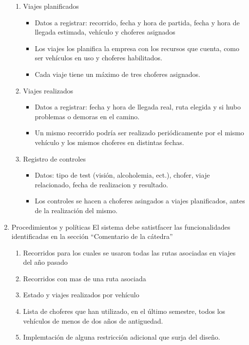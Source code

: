 \begin{enumerate}
  \begin{enumerate}[label=\Roman{*}]
  \item Viajes planificados
    \begin{itemize}
      \item Datos a registrar: recorrido, fecha y hora de partida, fecha y hora de llegada estimada, veh\'iculo y choferes asignados
      \item Los viajes los planifica la empresa con los recursos que cuenta, como ser veh\'iculos en uso y choferes habilitados. 
      \item Cada viaje tiene un m\'aximo de tres choferes asignados.
    \end{itemize}  
  \item Viajes realizados
    \begin{itemize}
      \item Datos a registrar: fecha y hora de llegada real, ruta elegida y si hubo problemas o demoras en el camino.
      \item Un mismo recorrido podría ser realizado periódicamente por el mismo vehículo y los mismos choferes en distintas fechas.
    \end{itemize}  
  \item Registro de controles
    \begin{itemize}
      \item Datos: tipo de test (visi\'on, alcoholemia, ect.), chofer, viaje relacionado, fecha de realizacion y resultado.
      \item Los controles se hacen a choferes asingados a viajes planificados, antes de la realizaci\'on del mismo.
    \end{itemize}  
  \end{enumerate}
\item Procedimientos y pol\'iticas
  El sistema debe satistfacer las funcionalidades identificadas en la secci\'on ``Comentario de la c\'atedra''
  \begin{enumerate}[label=\Roman{*}]
  \item Recorridos para los cuales se usaron todas las rutas asociadas en viajes del a\~no pasado
  \item Recorridos con mas de una ruta asociada
  \item Estado y viajes realizados por veh\'iculo
  \item Lista de choferes que han utilizado, en el \'ultimo semestre, todos los veh\'iculos de menos de dos a\~nos de antiguedad.
  \item Implemtaci\'on de alguna restricci\'on adicional que surja del dise\~no.
  \end{enumerate}
\end{enumerate}
